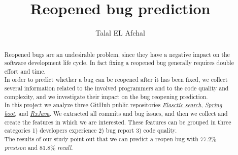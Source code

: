 \documentclass[sigconf,review]{acmart}
\begin{document}
\title{Reopened bug prediction }
\author{Talal EL Afchal}

\begin{abstract}
Reopened bugs are an undesirable problem, since they have a negative impact on the software development life cycle. In fact fixing a reopened bug generally requires double effort and time.\\
In order to predict whether a bug can be reopened after it has been fixed, we collect several information related to the involved programmers and to the code quality and complexity, and we investigate their impact on the bug reopening prediction. \\
In this project we analyze three GitHub public repositories  \href{https://github.com/elastic/elasticsearch}{\emph{Elasctic search}}, \href{https://github.com/spring-projects/spring-boot}{\emph{Spring boot}}, and \href{https://github.com/ReactiveX/RxJava}{\emph{RxJava}}. We extracted all commits and bug issues, and then we collect and create the features in which we are interested. These features can be grouped in three categories 1) developers experience 2) bug report 3) code quality.\\
The results of our study point out that we can predict a reopen bug with $77.2\%$ \emph{presison} and $81.8\%$ \emph{recall}.
\end{abstract}

\maketitle
\end{document}
